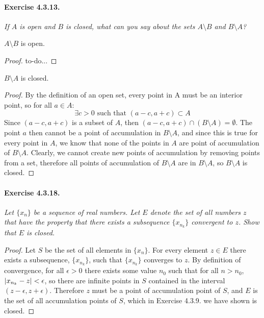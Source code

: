 \documentclass[11pt]{article}
\DeclarePairedDelimiter{\abs}{\lvert}{\rvert}
\def \xn {x_n}
\begin{document}
\newpage
\def \AB {A \setminus B} 
\def \BA {B \setminus A} 
\def \poa {point of accumulation}
\paragraph{Exercise 4.3.13.} \textit{If $A$ is open and $B$ is closed, what can you say about the sets $\AB$ and $\BA$?} \newline

$\AB$ is open.
\begin{proof}
	to-do...
\end{proof}

$\BA$ is closed.
\begin{proof}
By the definition of an open set, every point in A must be an interior point, so for all $a \in A$: $$\exists c > 0 \text{ such that } (a - c, a + c) \subset A$$ Since $(a - c, a + c)$ is a subset of $A$, then $(a - c, a + c) \cap (\BA) = \emptyset$. The point $a$ then cannot be a {\poa} in $\BA$, and since this is true for every point in $A$, we know that none of the points in $A$ are point of accumulation of $\BA$. Clearly, we cannot create new points of accumulation by removing points from a set, therefore all points of accumulation of $\BA$ are in $\BA$, so $\BA$ is closed.
\end{proof}

\def \setxn {\{\xn\}}
\def \xnk {x_{n_k}}
\def \setxnk {\{\xnk\}}
\paragraph{Exercise 4.3.18.} \textit{Let $\{x_n\}$ be a sequence of real numbers.
Let $E$ denote the set of all numbers $z$ that have the property that there exists a subsequence $\{x_{n_k}\}$ convergent to $z$. Show that $E$ is closed.} 

\begin{proof}
Let $S$ be the set of all elements in $\setxn$. For every element $z \in E$ there exists a subsequence, $\setxnk$, such that $\setxnk$ converges to $z$. By definition of convergence, for all $\epsilon > 0$ there exists some value $n_0$ such that for all $n > n_0$, $\abs*{\xnk - z} < \epsilon$, so there are infinite points in $S$ contained in the interval $(z - \epsilon, z + \epsilon)$. Therefore $z$ must be a point of accumulation point of $S$, and $E$ is the set of all accumulation points of $S$, which in Exercise 4.3.9. we have shown is closed.
\end{proof}
\end{document}
